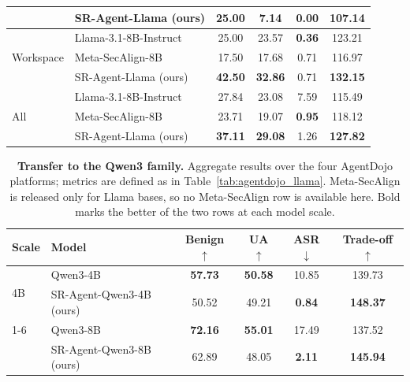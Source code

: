 \begin{table}[t]
{\begin{tabular}{llcccc}
& SR-Agent-Llama (ours) & 25.00 & 7.14 & \textbf{0.00} & 107.14 \\
\midrule
\multirow{3}{*}{Workspace}
& Llama-3.1-8B-Instruct & 25.00 & 23.57 & \textbf{0.36} & 123.21 \\
& Meta-SecAlign-8B & 17.50 & 17.68 & 0.71 & 116.97 \\
& SR-Agent-Llama (ours) & \textbf{42.50} & \textbf{32.86} & 0.71 & \textbf{132.15} \\
\midrule
\multirow{3}{*}{All}
& Llama-3.1-8B-Instruct & 27.84 & 23.08 & 7.59 & 115.49 \\
& Meta-SecAlign-8B & 23.71 & 19.07 & \textbf{0.95} & 118.12 \\
& SR-Agent-Llama (ours) & \textbf{37.11} & \textbf{29.08} & 1.26 & \textbf{127.82} \\
\bottomrule
\end{tabular}%
}
\end{table}

\begin{table}[t]
\centering
\small
\setlength{\tabcolsep}{5pt}
\caption{\textbf{Transfer to the Qwen3 family.} Aggregate results over the four AgentDojo platforms; metrics are
defined as in Table~\ref{tab:agentdojo_llama}. Meta-SecAlign is released only for Llama bases, so no Meta-SecAlign row
is available here. Bold marks the better of the two rows at each model scale.}
\label{tab:agentdojo_qwen}
\begin{tabular}{llcccc}
\toprule
\textbf{Scale} & \textbf{Model}
& \textbf{Benign} $\uparrow$
& \textbf{UA} $\uparrow$
& \textbf{ASR} $\downarrow$
& \textbf{Trade-off} $\uparrow$ \\
\midrule
\multirow{2}{*}{4B} & Qwen3-4B & \textbf{57.73} & \textbf{50.58} & 10.85 & 139.73 \\
& SR-Agent-Qwen3-4B (ours) & 50.52 & 49.21 & \textbf{0.84} & \textbf{148.37} \\
\cmidrule(lr){1-6}
\multirow{2}{*}{8B} & Qwen3-8B & \textbf{72.16} & \textbf{55.01} & 17.49 & 137.52 \\
& SR-Agent-Qwen3-8B (ours) & 62.89 & 48.05 & \textbf{2.11} & \textbf{145.94} \\\bottomrule
\end{tabular}
\end{table}
